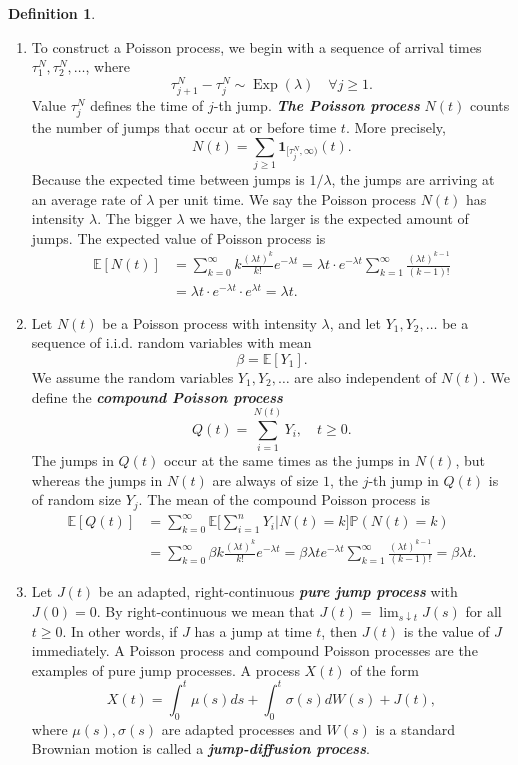 \documentclass[a4paper,11pt]{book}
\theoremstyle{plain}
\theoremstyle{definition}
\newtheorem{defn}[thm]{Definition}
\newcommand{\ME}{\mathbb{E}}
\newcommand{\MP}{\mathbb{P}}
\newcommand{\define}[1]{\textit{\textbf{#1}}}
\begin{document}
    \begin{defn} \
    	\begin{enumerate}
    		\item To construct a Poisson process, we begin with a sequence of arrival times $\tau_1^N, \tau_2^N, \dots$, where
    		\[ \tau_{j+1}^N - \tau_j^N \sim \operatorname{Exp}(\lambda) \quad \forall j \geq 1.  \]
    		Value $\tau_j^N$ defines the time of $j$-th jump. \define{The Poisson process} $N(t)$ counts the number of jumps that occur at or before time $t$. More precisely,
    		\[ N(t) = \sum_{j \geq 1} \mathbf{1}_{[\tau_j^N, \infty)} (t). \]
    		Because the expected time between jumps is $1/\lambda$, the jumps are arriving at an average rate of $\lambda$ per unit time. We say the Poisson process $N(t)$ has intensity $\lambda$. The bigger $\lambda$ we have, the larger is the expected amount of jumps. The expected value of Poisson process is
    		\[ 
    		\begin{aligned}
    		\ME[N(t)] &= \sum_{k=0}^{\infty} k \frac{(\lambda t)^k}{k!}e^{-\lambda t} = \lambda t \cdot e^{-\lambda t} \sum_{k=1}^{\infty} \frac{(\lambda t)^{k-1}}{(k-1)!} \\
    		& = \lambda t \cdot e^{-\lambda t} \cdot e^{\lambda t} = \lambda t.
    		\end{aligned}
    		\]
    		\item Let $N(t)$ be a Poisson process with intensity $\lambda$, and let $Y_1, Y_2, \dots$ be a sequence of i.i.d. random variables with mean
    		\[ \beta = \ME[Y_1]. \]
    		We assume the random variables $Y_1, Y_2, \dots$ are also independent of $N(t)$. We define the \define{compound Poisson process}
    		\[ Q(t) = \sum_{i=1}^{N(t)} Y_i, \quad t \geq 0. \]
    		The jumps in $Q(t)$ occur at the same times as the jumps in $N(t)$, but whereas the jumps in $N(t)$ are always of size $1$, the $j$-th jump in $Q(t)$ is of random size $Y_j$. The mean of the compound Poisson process is
    		\[ 
    		\begin{aligned}
    		\ME[Q(t)] & = \sum_{k = 0}^{\infty} \ME\Big[\sum_{i=1}^{n} Y_i | N(t) = k\Big] \MP(N(t) = k) \\
    		& = \sum_{k = 0}^{\infty}  \beta k \frac{(\lambda t)^k}{k!} e^{-\lambda t} = \beta \lambda t e^{-\lambda t} \sum_{k = 1}^{\infty} \frac{(\lambda t)^{k-1}}{(k-1)!} = \beta \lambda t.
    		\end{aligned}
    		 \]
    		\item
    		Let $J(t)$ be an adapted, right-continuous \define{pure jump process} with $J(0) = 0$. By right-continuous we mean that $J(t) = \lim_{s \downarrow t}J(s)$ for all $t \geq 0$. In other words, if $J$ has a jump at time $t$, then $J(t)$ is the value of $J$ immediately.  A Poisson process and compound Poisson processes are the examples of pure jump processes. A process $X(t)$ of the form
    		\[ X(t) = \int_{0}^t \mu(s)ds + \int_{0}^{t} \sigma(s) dW(s) + J(t), \]
    		where $\mu(s), \sigma(s)$ are adapted processes and $W(s)$ is a standard Brownian motion is called a \define{jump-diffusion process}.
    	\end{enumerate}
    \end{defn}
    
\end{document}
